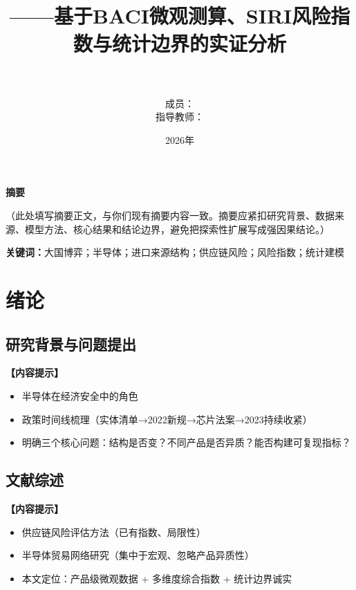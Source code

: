 \documentclass[UTF8,a4paper,12pt]{ctexart}
\title{\textbf{\papertitle} \\[1ex]
\large ——基于BACI微观测算、SIRI风险指数与统计边界的实证分析}
\author{\school \\ \teamname \\[1ex] 成员：\members \\[1ex] 指导教师：\advisor}
\date{2026年}
\newcommand{\paperabstract}[2]{%
  \begin{center}
  {\bfseries\large 摘\quad 要}
  \end{center}
  \vspace{0.5ex}
  #1
  \vspace{0.8ex}

  \noindent\textbf{关键词：}#2
}
\begin{document}
\maketitle
\thispagestyle{empty}
\clearpage

\paperabstract{%
（此处填写摘要正文，与你们现有摘要内容一致。摘要应紧扣研究背景、数据来源、模型方法、核心结果和结论边界，避免把探索性扩展写成强因果结论。）
}{大国博弈；半导体；进口来源结构；供应链风险；风险指数；统计建模}

\clearpage

\tableofcontents
\clearpage

\section{绪论}

\subsection{研究背景与问题提出}

\noindent\textbf{【内容提示】}
\begin{itemize}[nosep]
    \item 半导体在经济安全中的角色
    \item 政策时间线梳理（实体清单→2022新规→芯片法案→2023持续收紧）
    \item 明确三个核心问题：结构是否变？不同产品是否异质？能否构建可复现指标？
\end{itemize}

\subsection{文献综述}

\noindent\textbf{【内容提示】}
\begin{itemize}[nosep]
    \item 供应链风险评估方法（已有指数、局限性）
    \item 半导体贸易网络研究（集中于宏观、忽略产品异质性）
    \item 本文定位：产品级微观数据 + 多维度综合指数 + 统计边界诚实
\end{itemize}
\end{document}
